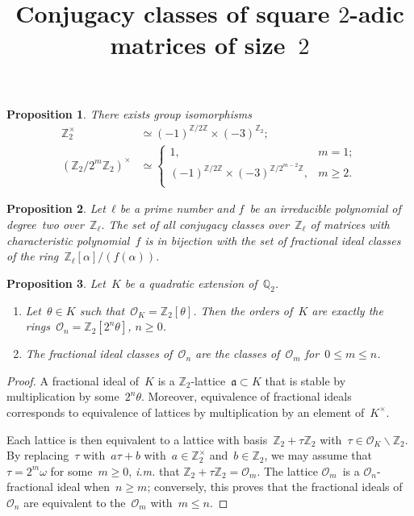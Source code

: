\documentclass{article}
\let\fr\mathfrak
\let\ro\mathscr
\newtheorem{prop}{Proposition}
\begin{document}
\title{Conjugacy classes of square $2$-adic matrices of size~$2$}

\begin{prop}
There exists group isomorphisms
\begin{align*}
ℤ_2^{×} &≃ (-1)^{ℤ/2ℤ} × (-3)^{ℤ_2};\\
(ℤ_2/2^m ℤ_2)^{×} &≃ \begin{cases} 1, & m = 1;\\
(-1)^{ℤ/2ℤ} × (-3)^{ℤ/2^{m-2}ℤ},& m ≥ 2.\\\end{cases}
\end{align*}
\end{prop}

\begin{prop}
Let~$ℓ$ be a prime number and $f$~be an irreducible polynomial of
degree~two over~$ℤ_{ℓ}$. The set of all conjugacy classes over~$ℤ_{ℓ}$ of
matrices with characteristic polynomial~$f$ is in bijection with the set
of fractional ideal classes of the ring~$ℤ_{ℓ}[α] / (f(α))$.
\end{prop}

\begin{prop}
Let~$K$ be a quadratic extension of~$ℚ_2$.
\begin{enumerate}
\item Let~$θ ∈ K$ such that~$\ro O_K = ℤ_2[θ]$. Then the orders of~$K$
are exactly the rings~$\ro O_n = ℤ_2[2^n θ]$, $n ≥ 0$.
\item The fractional ideal classes of~$\ro O_n$ are the classes of~$\ro
O_m$ for~$0 ≤ m ≤ n$.
\end{enumerate}
\end{prop}

\begin{proof}
A fractional ideal of~$K$ is a $ℤ_2$-lattice~$\fr a ⊂ K$ that is stable
by multiplication by some~$2^n θ$. Moreover, equivalence of fractional
ideals corresponds to equivalence of lattices by multiplication by an
element of~$K^{×}$.

Each lattice is then equivalent to a lattice with basis~$ℤ_2 + τ ℤ_2$
with~$τ ∈ \ro O_K ∖ ℤ_2$. By replacing~$τ$ with~$a τ + b$ with~$a ∈ ℤ_2^{×}$
and~$b ∈ ℤ_2$, we may assume that~$τ = 2^m ω$ for some~$m ≥ 0$,
\emph{i.m.} that $ℤ_2 + τ ℤ_2 = \ro O_m$. The lattice $\ro O_m$~is a $\ro
O_n$-fractional ideal when~$n ≥ m$; conversely, this proves that the
fractional ideals of~$\ro O_n$ are equivalent to the~$\ro O_m$ with~$m ≤
n$.
\end{proof}
\end{document}
